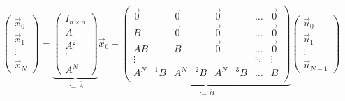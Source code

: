 \documentclass{article}
\begin{document}
\thispagestyle{empty}
$$
\begin{pmatrix}\vec{x}_0\\ \vec{x}_1 \\ \vdots \\ \vec{x}_N\end{pmatrix} =
\underbrace{\begin{pmatrix}I_{n\times n}\\A\\A^2\\\vdots\\A^N\end{pmatrix}}_{:= \bar{A}}\vec{x}_0
+
\underbrace{\begin{pmatrix}
\vec{0}  & \vec{0}  & \vec{0}  & \dots  & \vec{0} \\
B        & \vec{0}  & \vec{0}  & \dots  & \vec{0} \\
AB       & B        & \vec{0}  & \dots  & \vec{0} \\
\vdots   &          &          & \ddots & \vdots  \\
A^{N-1}B & A^{N-2}B & A^{N-3}B & \dots  & B       \\
\end{pmatrix}}_{:= \bar{B}}
\begin{pmatrix}\vec{u}_0\\ \vec{u}_1 \\ \vdots \\ \vec{u}_{N-1}\end{pmatrix} 
$$
\end{document}
